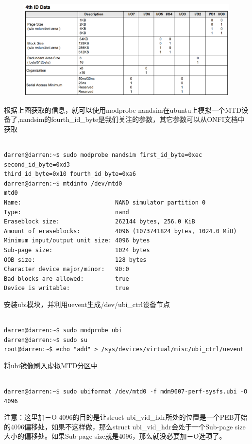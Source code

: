 \begin{figure}[htbp]
\centering
\includegraphics[keepaspectratio,width=\textwidth,height=0.75\textheight]{img/20170517170203.png}
\end{figure}
根据上图获取的信息，就可以使用modprobe nandsim在ubuntu上模拟一个MTD设备了,nandsim的fourth\_id\_byte是我们关注的参数，其它参数可以从ONFI文档中获取
\begin{mdframed}[backgroundcolor=lightgray,hidealllines=true]
\begin{verbatim}

darren@darren:~$ sudo modprobe nandsim first_id_byte=0xec second_id_byte=0xd3
third_id_byte=0x10 fourth_id_byte=0xa6
darren@darren:~$ mtdinfo /dev/mtd0
mtd0
Name:                           NAND simulator partition 0
Type:                           nand
Eraseblock size:                262144 bytes, 256.0 KiB
Amount of eraseblocks:          4096 (1073741824 bytes, 1024.0 MiB)
Minimum input/output unit size: 4096 bytes
Sub-page size:                  1024 bytes
OOB size:                       128 bytes
Character device major/minor:   90:0
Bad blocks are allowed:         true
Device is writable:             true

\end{verbatim}
\end{mdframed}
安装ubi模块，并利用uevent生成/dev/ubi\_ctrl设备节点
\begin{mdframed}[backgroundcolor=lightgray,hidealllines=true]
\begin{verbatim}

darren@darren:~$ sudo modprobe ubi
darren@darren:~$ sudo su
root@darren:~$ echo "add" > /sys/devices/virtual/misc/ubi_ctrl/uevent

\end{verbatim}
\end{mdframed}
将ubi镜像刷入虚拟MTD分区中
\begin{mdframed}[backgroundcolor=lightgray,hidealllines=true]
\begin{verbatim}

darren@darren:~$ sudo ubiformat /dev/mtd0 -f mdm9607-perf-sysfs.ubi -O 4096

\end{verbatim}
\end{mdframed}
注意：这里加－O 4096的目的是让struct ubi\_vid\_hdr所处的位置是一个PEB开始的4096偏移处，如果不这样做，那么struct ubi\_vid\_hdr会处于一个Sub-page size大小的偏移处。如果Sub-page size就是4096，那么就没必要加－O选项了。
\vspace{12 pt}

